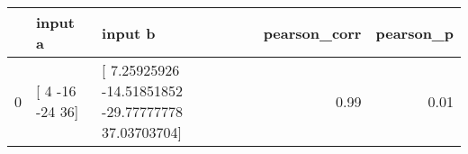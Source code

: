 \begin{tabular}{lllrr}
\toprule
 & input a & input b & pearson\_corr & pearson\_p \\
\midrule
0 & [  4 -16 -24  36] & [  7.25925926 -14.51851852 -29.77777778  37.03703704] & 0.99 & 0.01 \\
\bottomrule
\end{tabular}
